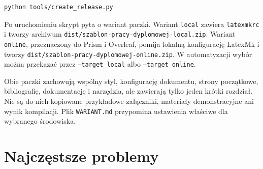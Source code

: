 \begin{lstlisting}[style=thesis-shell,caption={Utworzenie czystej paczki startowej},label={lst:paczka-startowa}]
python tools/create_release.py
\end{lstlisting}

Po uruchomieniu skrypt pyta o wariant paczki. Wariant \texttt{local} zawiera \texttt{latexmkrc} i tworzy archiwum \texttt{dist/szablon-pracy-dyplomowej-local.zip}. Wariant \texttt{online}, przeznaczony do Prism i Overleaf, pomija lokalną konfigurację LatexMk i tworzy \texttt{dist/szablon-pracy-dyplomowej-online.zip}. W automatyzacji wybór można przekazać przez \texttt{--target local} albo \texttt{--target online}.

Obie paczki zachowują wspólny styl, konfigurację dokumentu, strony początkowe, bibliografię, dokumentację i narzędzia, ale zawierają tylko jeden krótki rozdział. Nie są do nich kopiowane przykładowe załączniki, materiały demonstracyjne ani wynik kompilacji. Plik \texttt{WARIANT.md} przypomina ustawienia właściwe dla wybranego środowiska.

\section{Najczęstsze problemy}

